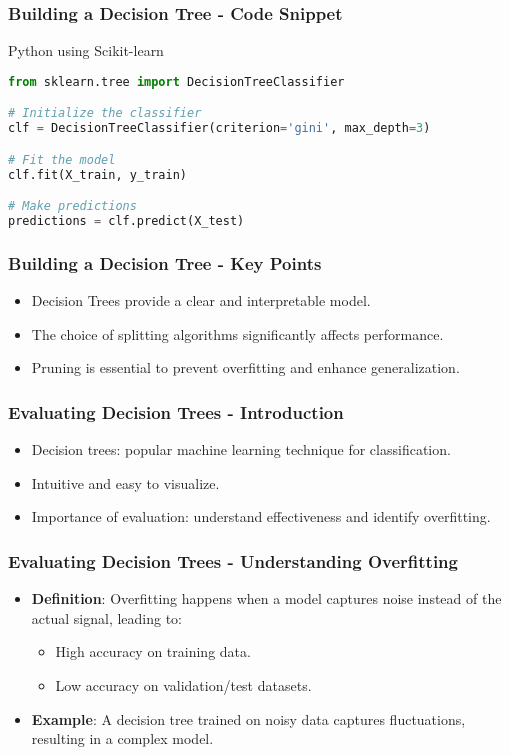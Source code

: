 \documentclass[aspectratio=169]{beamer}
\begin{document}
\begin{frame}[fragile]
    \frametitle{Building a Decision Tree - Code Snippet}
    \begin{block}{Python using Scikit-learn}
    \begin{lstlisting}[language=Python]
from sklearn.tree import DecisionTreeClassifier

# Initialize the classifier
clf = DecisionTreeClassifier(criterion='gini', max_depth=3)

# Fit the model
clf.fit(X_train, y_train)

# Make predictions
predictions = clf.predict(X_test)
    \end{lstlisting}
    \end{block}
\end{frame}

\begin{frame}
    \frametitle{Building a Decision Tree - Key Points}
    \begin{itemize}
        \item Decision Trees provide a clear and interpretable model.
        \item The choice of splitting algorithms significantly affects performance.
        \item Pruning is essential to prevent overfitting and enhance generalization.
    \end{itemize}
\end{frame}

\begin{frame}[fragile]
    \frametitle{Evaluating Decision Trees - Introduction}
    \begin{itemize}
        \item Decision trees: popular machine learning technique for classification.
        \item Intuitive and easy to visualize.
        \item Importance of evaluation: understand effectiveness and identify overfitting.
    \end{itemize}
\end{frame}

\begin{frame}[fragile]
    \frametitle{Evaluating Decision Trees - Understanding Overfitting}
    \begin{itemize}
        \item \textbf{Definition}: Overfitting happens when a model captures noise instead of the actual signal, leading to:
        \begin{itemize}
            \item High accuracy on training data.
            \item Low accuracy on validation/test datasets.
        \end{itemize}
        \item \textbf{Example}: A decision tree trained on noisy data captures fluctuations, resulting in a complex model.
    \end{itemize}
\end{frame}
\end{document}
